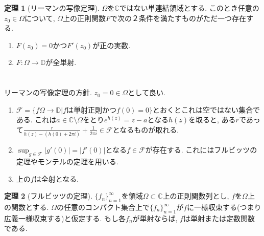 \documentclass[dvipdfmx,a4paper,11pt]{article}
\newcommand{\C}{\mathbb{C}}
\newcommand{\D}{\mathbb{D}}
\theoremstyle{definition}
\newtheorem{thm}{定理}
\begin{document}
\begin{tcolorbox}[
    colback = white,
    colframe = green!35!black,
    fonttitle = \bfseries,
    breakable = true]
    \begin{thm}[リーマンの写像定理]
$\Omega$を$\C$ではない単連結領域とする.
このとき任意の$z_0 \in \Omega$について, $\Omega$上の正則関数$F$で次の２条件を満たすものがただ一つ存在する.
    \begin{enumerate}
    \setlength{\parskip}{0cm} 
  \setlength{\itemsep}{0cm} 
  \item $F(z_0) =0$かつ$F' (z_0)$が正の実数.
  \item $F : \Omega \rightarrow \D$が全単射.
  \end{enumerate}
    \end{thm}
\end{tcolorbox}
\section{}

リーマンの写像定理の方針. $z_0 =0 \in \Omega$として良い.
\begin{enumerate}
\setlength{\parskip}{0cm} 
  \setlength{\itemsep}{0cm} 
  \item $\mathcal{F} = \{ f \Omega \rightarrow \D | \text{$f$は単射正則かつ$f(0)=0$}\}$とおくとこれは空ではない集合である. これは$a \in \C \setminus \Omega$をとり$e^{h(z)} = z-a$となる$h(z)$を取ると, ある$r$であって$\frac{r}{h(z) - (h(0) + 2 \pi i)}  + \frac{1}{2 \pi i} \in \mathcal{F}$となるものが取れる. 
  \item $\sup_{g \in \mathcal{F}} |g'(0)| =  |f'(0)|$となる$f\in \mathcal{F}$が存在する. これにはフルビッツの定理やモンテルの定理を用いる. 
  \item 上の$f$は全射となる. 
\end{enumerate}

\begin{tcolorbox}[
    colback = white,
    colframe = green!35!black,
    fonttitle = \bfseries,
    breakable = true]
    \begin{thm}[フルビッツの定理]
   $\{ f_{n}\}_{n=1}^{\infty}$を領域$\Omega \subset \C$上の正則関数列とし, $f$を$\Omega$上の関数とする.
$\Omega$の任意のコンパクト集合上で$\{ f_{n}\}_{n=1}^{\infty}$が$f$に一様収束する(つまり広義一様収束する)と仮定する. 
もし各$f_n$が単射ならば, $f$は単射または定数関数である. 
    \end{thm}
\end{tcolorbox}

\section{}
\end{document}
